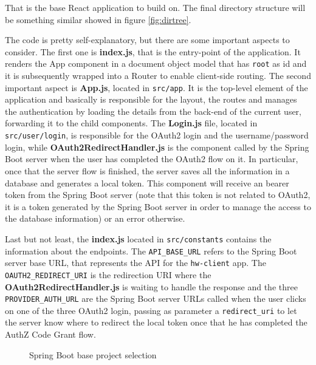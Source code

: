 \noindent That is the base React application to build on. The final directory structure will be something similar showed in figure \ref{fig:dirtree}.

The code is pretty self-explanatory, but there are some important aspects to consider. The first one is \textbf{index.js}, that is the entry-point of the application. It renders the App component in a document object model that has \texttt{root} as id and it is subsequently wrapped into a Router to enable client-side routing. The second important aspect is \textbf{App.js}, located in \texttt{src/app}. It is the top-level element of the application and basically is responsible for the layout, the routes and manages the authentication by loading the details from the back-end of the current user, forwarding it to the child components. The \textbf{Login.js} file, located in \texttt{src/user/login}, is responsible for the OAuth2 login and the username/password login, while \textbf{OAuth2RedirectHandler.js} is the component called by the Spring Boot server when the user has completed the OAuth2 flow on it. In particular, once that the server flow is finished, the server saves all the information in a database and generates a local token. This component will receive an bearer token from the Spring Boot server (note that this token is not related to OAuth2, it is a token generated by the Spring Boot server in order to manage the access to the database information) or an error otherwise.

Last but not least, the \textbf{index.js} located in \texttt{src/constants} contains the information about the endpoints. The \texttt{API\_BASE\_URL} refers to the Spring Boot server base URL, that represents the API for the \texttt{hw-client} app. The \texttt{OAUTH2\_REDIRECT\_URI} is the redirection URI where the \\ \textbf{OAuth2RedirectHandler.js} is waiting to handle the response and the three \texttt{PROVIDER\_AUTH\_URL} are the Spring Boot server URLs called when the user clicks on one of the three OAuth2 login, passing as parameter a \texttt{redirect\_uri} to let the server know where to redirect the local token once that he has completed the AuthZ Code Grant flow. 

\begin{figure}[h!]
    \centering
    \caption{Spring Boot base project selection}
    \label{fig:spring}
\end{figure}

